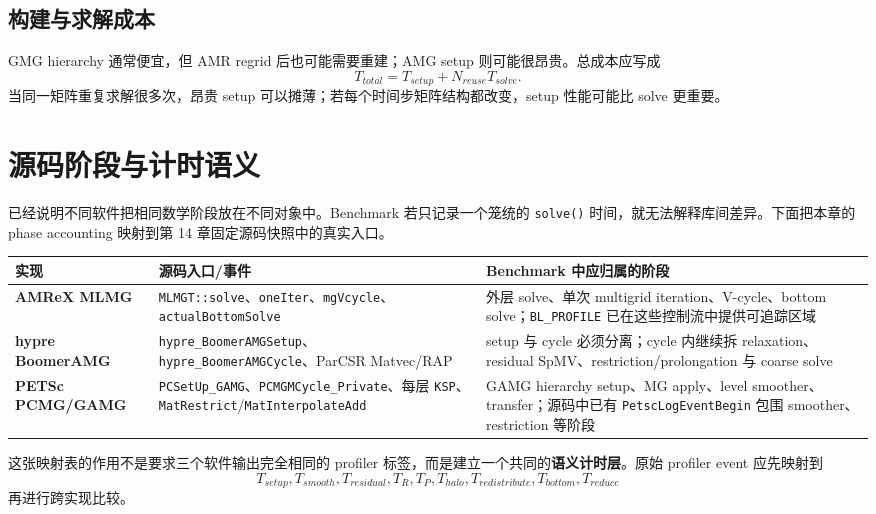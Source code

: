 \subsection{构建与求解成本}

GMG hierarchy 通常便宜，但 AMR regrid 后也可能需要重建；AMG setup 则可能很昂贵。总成本应写成
\begin{equation}
T_{total}=T_{setup}+N_{reuse}T_{solve}.
\end{equation}
当同一矩阵重复求解很多次，昂贵 setup 可以摊薄；若每个时间步矩阵结构都改变，setup 性能可能比 solve 更重要。

\section{源码阶段与计时语义}

已经说明不同软件把相同数学阶段放在不同对象中。Benchmark 若只记录一个笼统的 \texttt{solve()} 时间，就无法解释库间差异。下面把本章的 phase accounting 映射到第 14 章固定源码快照中的真实入口。

\begin{center}
\small
\begin{tabularx}{0.98\textwidth}{>{\bfseries}p{2.0cm}p{3.7cm}X}
\toprule
实现 & 源码入口/事件 & Benchmark 中应归属的阶段\\
\midrule
AMReX MLMG &
\texttt{MLMGT::solve}、\texttt{oneIter}、\texttt{mgVcycle}、\texttt{actualBottomSolve} &
外层 solve、单次 multigrid iteration、V-cycle、bottom solve；\texttt{BL\_PROFILE} 已在这些控制流中提供可追踪区域\\
hypre BoomerAMG &
\texttt{hypre\_BoomerAMGSetup}、\texttt{hypre\_BoomerAMGCycle}、ParCSR Matvec/RAP &
setup 与 cycle 必须分离；cycle 内继续拆 relaxation、residual SpMV、restriction/prolongation 与 coarse solve\\
PETSc PCMG/GAMG &
\texttt{PCSetUp\_GAMG}、\texttt{PCMGMCycle\_Private}、每层 \texttt{KSP}、\texttt{MatRestrict}/\texttt{MatInterpolateAdd} &
GAMG hierarchy setup、MG apply、level smoother、transfer；源码中已有 \texttt{PetscLogEventBegin} 包围 smoother、restriction 等阶段\\
\bottomrule
\end{tabularx}
\end{center}

这张映射表的作用不是要求三个软件输出完全相同的 profiler 标签，而是建立一个共同的\textbf{语义计时层}。原始 profiler event 应先映射到
\begin{equation}
\boxed{
T_{setup},
T_{smooth},
T_{residual},
T_R,
T_P,
T_{halo},
T_{redistribute},
T_{bottom},
T_{reduce}
}
\label{eq:benchmark-semantic-bins}
\end{equation}
再进行跨实现比较。


